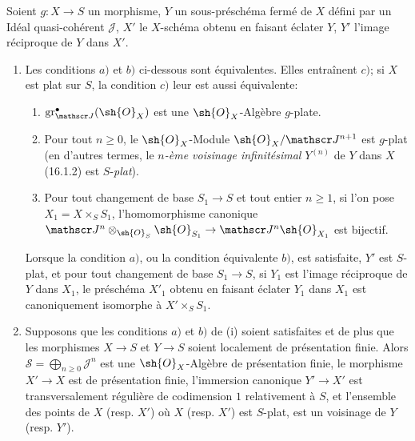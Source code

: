 \begin{proposition}[19.4.6]
\label{IV.19.4.6}
Soient $g:X\to S$ un morphisme, $Y$ un sous-préschéma fermé de $X$ défini par un Idéal quasi-cohérent $\mathscr J$, $X'$ le $X$-schéma obtenu en faisant éclater $Y$, $Y'$ l'image réciproque de $Y$ dans $X'$.
\begin{enumerate}
  \item[\textup{(i)}] Les conditions $a)$ et $b)$ ci-dessous sont équivalentes. Elles entraînent $c)$; si $X$ est plat sur $S$, la condition $c)$ leur est aussi équivalente:
  \begin{enumerate}
    \item[\textup{a)}] $\operatorname{gr}_{\mathscr J}^\bullet(\sh{O}_X)$ est une $\sh{O}_X$-Algèbre $g$-plate.
    \item[\textup{b)}] Pour tout $n\geq0$, le $\sh{O}_X$-Module $\sh{O}_X/\mathscr J^{n+1}$ est $g$-plat \textup{(en d'autres termes, le \emph{$n$-ème voisinage infinitésimal} $Y^{(n)}$ de $Y$ dans $X$ (16.1.2) est $S$-\emph{plat})}.
    \item[\textup{c)}] Pour tout changement de base $S_1\to S$ et tout entier $n\geq1$, si l'on pose $X_1=X\times_S S_1$, l'homomorphisme canonique $\mathscr J^n\otimes_{\sh{O}_S}\sh{O}_{S_1}\to\mathscr J^n\sh{O}_{X_1}$ est bijectif.
  \end{enumerate}

  Lorsque la condition $a)$, ou la condition équivalente $b)$, est satisfaite, $Y'$ est $S$-plat, et pour tout changement de base $S_1\to S$, si $Y_1$ est l'image réciproque de $Y$ dans $X_1$, le préschéma $X'_1$ obtenu en faisant éclater $Y_1$ dans $X_1$ est canoniquement isomorphe à $X'\times_S S_1$.
  \item[\textup{(ii)}] Supposons que les conditions $a)$ et $b)$ de \textup{(i)} soient satisfaites et de plus que les morphismes $X\to S$ et $Y\to S$ soient localement de présentation finie. Alors $\mathscr S=\bigoplus_{n\geq0}\mathscr J^n$ est une $\sh{O}_X$-Algèbre de présentation finie, le morphisme $X'\to X$ est de présentation finie, l'immersion canonique $Y'\to X'$ est transversalement régulière de codimension $1$ relativement à $S$, et l'ensemble des points de $X$ \textup{(resp. $X'$)} où $X$ \textup{(resp. $X'$)} est $S$-plat, est un voisinage de $Y$ \textup{(resp. $Y'$)}.
\end{enumerate}
\end{proposition}

